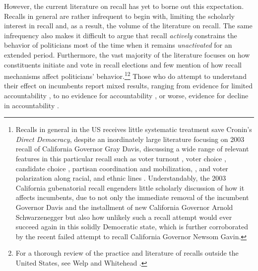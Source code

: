 \documentclass{article}
\begin{document}
		However, the current literature on recall has yet to borne out this expectation.
		Recalls in general are rather infrequent to begin with,
		limiting the scholarly interest in recall and,
		as a result,
		the volume of the literature on recall.
		The same infrequency also makes it difficult to argue 
		that recall
		\textit
		{actively}
		constrains 
		the
		behavior of politicians 
		most of the time when it remains \textit{unactivated} for an extended period.
		Furthermore, the vast majority of the literature focuses on how 
		constituents initiate and vote in recall elections and 
		few mention of how recall mechanisms affect politicians' behavior.\footnote
		{
			Recalls in general in the US receives little systematic treatment save Cronin's
			\autocite*{croninDirectDemocracyPolitics1989}
			\textit{Direct Democracy}, despite an inordinately large literature focusing on 2003 recall of California Governor Gray Davis, 
			discussing a wide range of relevant features in this particular recall such as 
			voter turnout
			\autocite{arbourVoterTurnoutCalifornia2005},
			voter choice 
			\autocite{alvarezRationalityRationalisticChoice2009,shawStrategicVotingCalifornia2005},
			candidate choice
			\autocite{mcgheeRoleCandidateChoice2009},
			partisan coordination and mobilization,
			\autocite{masketCaliforniaRecallSprint2016},
			and
			voter polarization along
			racial, and ethnic
			lines
			\autocite{seguraRaceRecallRacial2008}.
			Understandably, the 2003 California gubenatorial recall engenders little scholarly
			discussion of how it affects incumbents, 
			due to not only the immediate removal of the incumbent Governor Davis and 
			the
			installment of new California Governor Arnold Schwarzenegger
			but also 
			how unlikely such a recall attempt
			would ever succeed again in this solidly Democratic state,
			which is further corroborated by the recent failed attempt to recall California Governor Newsom Gavin.
		}\footnote
		{
			For a thorough review of the practice and literature of recalls outside the United States,
			see Welp and Whitehead \autocite*{welpPoliticsRecallElections2020}.
		}
		Those who do attempt to understand their effect on incumbents report mixed results, 
		ranging from evidence for limited accountability
		\autocite{okamotoRecallJapanMeasure2020},
		to
		no evidence for accountability
		\autocite{welpRecallReferendumsPeruvian2016},
		or worse,
		evidence for decline in accountability
		\autocite{hamanRecallElectionsTool2021}.
		
\end{document}
